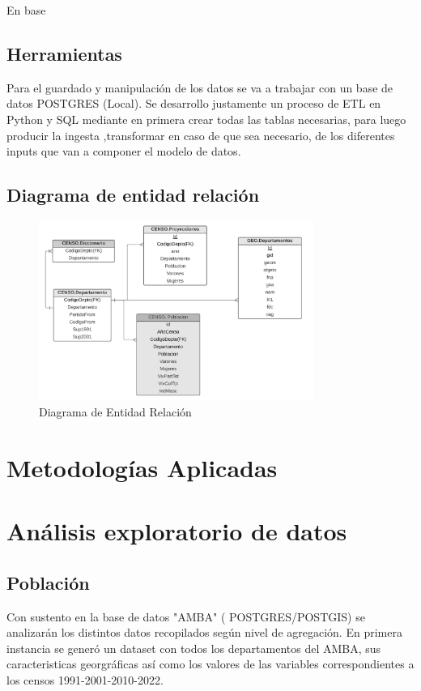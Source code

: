 \documentclass{article}
\theoremstyle{mytheoremstyle}
\theoremstyle{mytheoremstyle}
\theoremstyle{myproblemstyle}
\begin{document}
En base

\subsection{Herramientas }
Para el guardado y manipulación de los datos se va a trabajar con un base de datos POSTGRES (Local). 
Se desarrollo justamente un proceso de ETL en Python y SQL mediante en primera crear todas las tablas necesarias, 
para luego producir la ingesta ,transformar en caso de que sea necesario, de los diferentes inputs que van a componer el modelo de datos.	


\subsection{Diagrama de entidad relación }

\begin{figure}[htbp]
    \centering
    \includegraphics[width=0.8\textwidth]{img/DER.jpg}
    \caption{Diagrama de Entidad Relación}
    \label{fig:DER}
\end{figure}


\section{Metodologías Aplicadas}




\section{ Análisis exploratorio de datos}
\subsection{Población}
Con sustento en la base de datos "AMBA" ( POSTGRES/POSTGIS) se analizarán los distintos datos recopilados según nivel de agregación.
En primera instancia se  generó un dataset con todos los departamentos del AMBA, sus caracteristicas georgráficas así como los valores
de las variables correspondientes a los censos 1991-2001-2010-2022. 
 
\end{document}
